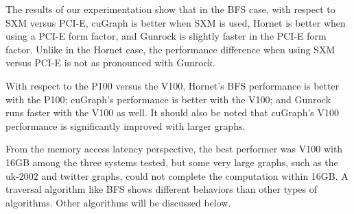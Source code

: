 The results of our experimentation show that in the BFS case, with respect to SXM versus PCI-E, cuGraph is better when SXM is used, Hornet is better when using a PCI-E form factor, and Gunrock is slightly faster in the PCI-E form factor. Unlike in the Hornet case, the performance difference when using SXM versus PCI-E is not as pronounced with Gunrock. 

With respect to the P100 versus the V100, Hornet's BFS performance is better with the P100; cuGraph's performance is better with the V100; and Gunrock runs faster with the V100 as well. It should also be noted that cuGraph's V100 performance is significantly improved with larger graphs.

From the memory access latency perspective, the best performer was V100 with 16GB among the three systems tested, but some very large graphs, such as the uk-2002 and twitter graphs, could not complete the computation within 16GB. A traversal algorithm like BFS shows different behaviors than other types of algorithms. Other algorithms will be discussed below.


